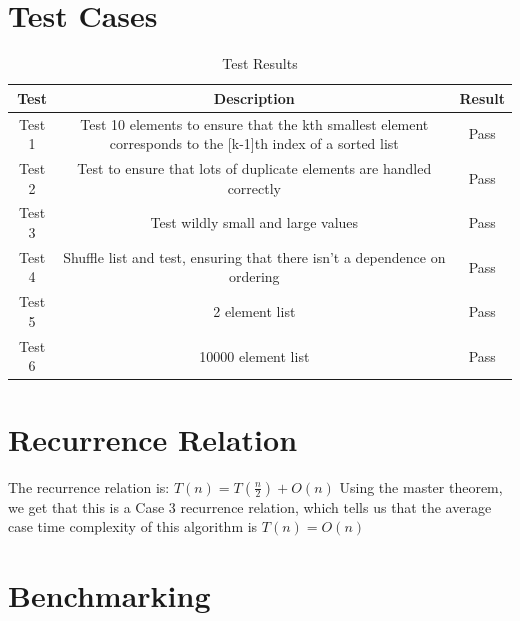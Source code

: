 \documentclass{labReport}
\begin{document}
\section{Test Cases}
\begin{table}[h!]
    \centering
    \begin{tabular}{|c|c|c|}
    \hline
    Test & Description & Result \\
    \hline
    Test 1 & Test 10 elements to ensure that the kth smallest element corresponds to the [k-1]th index of a sorted list & Pass \\
    Test 2 & Test to ensure that lots of duplicate elements are handled correctly & Pass \\
    Test 3 & Test wildly small and large values & Pass \\
    Test 4 & Shuffle list and test, ensuring that there isn't a dependence on ordering & Pass \\
    Test 5 & 2 element list & Pass \\
    Test 6 & 10000 element list & Pass \\
    \hline
    \end{tabular}
    \caption{Test Results}
    \label{table:test_results}
\end{table}

\section{Recurrence Relation}
The recurrence relation is:
$T(n) = T(\frac{n}{2})+O(n)$
Using the master theorem, we get that this is a Case 3 recurrence relation, which tells us that the average case time complexity of this algorithm is $T(n) = O(n)$

\section{Benchmarking}
\end{document}
